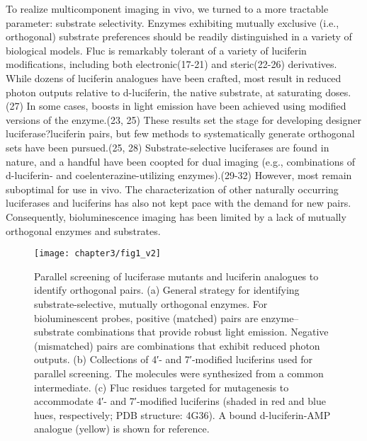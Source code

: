\par
To realize multicomponent imaging in vivo, we turned to a more tractable parameter: substrate selectivity. Enzymes exhibiting mutually exclusive (i.e., orthogonal) substrate preferences should be readily distinguished in a variety of biological models. Fluc is remarkably tolerant of a variety of luciferin modifications, including both electronic\cite{Woodroofe:2012vx,McCutcheon:2012ixb,Conley:2012gha,Kuchimaru:2016eba,BRANCHING:1989ct}(17-21) and steric\cite{Steinhardt:2016in,Jones:2017be,Jathoul:2014do,Woodroofe:2008faa,Mofford:2014iwa}(22-26) derivatives. While dozens of luciferin analogues have been crafted, most result in reduced photon outputs relative to d-luciferin, the native substrate, at saturating doses.\cite{Rathbun:2017kj}(27) In some cases, boosts in light emission have been achieved using modified versions of the enzyme.\cite{Mofford:2014iwa,Jones:2017be}(23, 25) These results set the stage for developing designer luciferase?luciferin pairs, but few methods to systematically generate orthogonal sets have been pursued.\cite{Jones:2017be,Nishihara:2017bd}(25, 28) Substrate-selective luciferases are found in nature, and a handful have been coopted for dual imaging (e.g., combinations of d-luciferin- and coelenterazine-utilizing enzymes).\cite{Petushkov:2014ha,Kaskova:2017ed,Paley:2014ila,Stacer:2013el}(29-32) However, most remain suboptimal for use in vivo. The characterization of other naturally occurring luciferases and luciferins has also not kept pace with the demand for new pairs. Consequently, bioluminescence imaging has been limited by a lack of mutually orthogonal enzymes and substrates.
\par
\begin{figure}[htbp]
\texttt{[image: chapter3/fig1\_v2]}
\centering
\caption[Parallel screening of luciferase mutants and luciferin analogues to identify orthogonal pairs]{Parallel screening of luciferase mutants and luciferin analogues to identify orthogonal pairs. (a) General strategy for identifying substrate-selective, mutually orthogonal enzymes. For bioluminescent probes, positive (matched) pairs are enzyme–substrate combinations that provide robust light emission. Negative (mismatched) pairs are combinations that exhibit reduced photon outputs. (b) Collections of 4′- and 7′-modified luciferins used for parallel screening. The molecules were synthesized from a common intermediate. (c) Fluc residues targeted for mutagenesis to accommodate 4′- and 7′-modified luciferins (shaded in red and blue hues, respectively; PDB structure: 4G36). A bound d-luciferin-AMP analogue (yellow) is shown for reference.}
  \label{fig:overview}
\end{figure}
